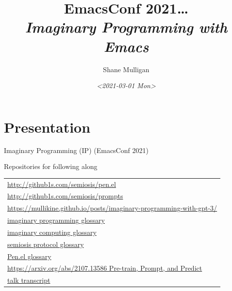 \documentclass[presentation]{beamer}
\author{Shane Mulligan \\  }
\date{\textit{<2021-03-01 Mon>}}
\title{EmacsConf 2021\ldots{} \\   \emph{\alert{Imaginary Programming with Emacs}} \\  }
\begin{document}
\maketitle

\section{Presentation}
\label{sec:orgfb05e82}
\begin{frame}[label={sec:orgc0d1b98}]{Imaginary Programming (IP) (EmacsConf 2021)}
\begin{block}{Repositories for following along}
{\tiny
\begin{center}
\begin{tabular}{l}
\url{http://github1s.com/semiosis/pen.el}\\
\url{http://github1s.com/semiosis/prompts}\\
\url{https://mullikine.github.io/posts/imaginary-programming-with-gpt-3/}\\
\href{http://github.com/semiosis/glossaries-gh/blob/master/imaginary-programming.txt}{imaginary programming glossary}\\
\href{http://github.com/semiosis/glossaries-gh/blob/master/imaginary-computing.txt}{imaginary computing glossary}\\
\href{http://github.com/semiosis/glossaries-gh/blob/master/semiosis-protocol.txt}{semiosis protocol glossary}\\
\href{http://github.com/semiosis/glossaries-gh/blob/master/pen.el.txt}{Pen.el glossary}\\
\href{https://arxiv.org/abs/2107.13586}{https://arxiv.org/abs/2107.13586 Pre-train, Prompt, and Predict}\\
\href{http://github1s.com/mullikine/imaginary-programming-transcript-emacsconf-2021}{talk transcript}\\
\end{tabular}
\end{center}
}
\end{block}
\end{frame}
\end{document}
